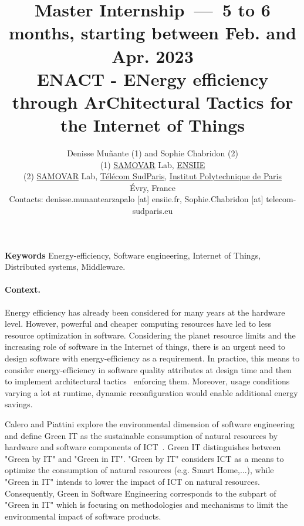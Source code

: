 \documentclass[a4paper,10pt]{article}
\title{{\normalsize Master Internship~---~5 to 6 months, starting between Feb. and Apr. 2023}\\
ENACT - ENergy efficiency through ArChitectural Tactics for the Internet of Things}
\author{Denisse Muñante (1) and Sophie Chabridon (2)\\
\small (1)  \href{http://samovar.telecom-sudparis.eu/}{SAMOVAR} Lab,  \href{https://www.ensiie.fr}{ENSIIE} \\
\small (2)  \href{http://samovar.telecom-sudparis.eu/}{SAMOVAR} Lab, \href{https://www.telecom-sudparis.eu}{Télécom SudParis}, \href{https://www.ip-paris.fr/}{Institut Polytechnique de Paris}\\
\small \'Evry, France\\
\small Contacts: denisse.munantearzapalo [at] ensiie.fr,  Sophie.Chabridon [at] telecom-sudparis.eu}
\date{}
\begin{document}
\maketitle
\thispagestyle{empty}

\vspace{-0.25cm}

\noindent\textbf{Keywords} Energy-efficiency, Software engineering, Internet of Things, Distributed systems, Middleware.

\paragraph{Context.}
Energy efficiency has already been considered for many years at the hardware level. However, powerful and cheaper computing resources have led to less resource optimization in software. Considering the planet resource limits and the increasing role of software in the Internet of things, there is an urgent need to design software with energy-efficiency as a requirement. 
In practice, this means to consider energy-efficiency in software quality attributes at design time and then to implement architectural tactics~\cite{2021-Paradis} enforcing them. Moreover, usage conditions varying a lot at runtime, dynamic reconfiguration would enable additional energy savings.

Calero and Piattini explore the environmental dimension of software engineering and define Green IT as the sustainable consumption of natural resources by hardware and software components of ICT~\cite{2015-Calero}. Green IT distinguishes between "Green by IT" and "Green in IT". "Green by IT" considers ICT as a means to optimize the consumption of natural resources (e.g. Smart Home,...), while "Green in IT" intends to lower the impact of ICT on natural resources. Consequently, Green in Software Engineering corresponds to the subpart of "Green in IT" which is focusing on methodologies and mechanisms to limit the environmental impact of software products.



\vspace{0.5cm}
\end{document}
